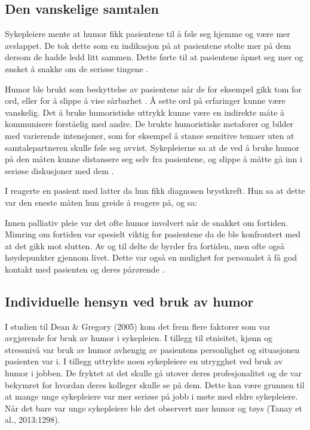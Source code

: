 \subsection{Den vanskelige samtalen}

Sykepleiere mente at humor fikk pasientene til å føle seg hjemme og være mer
avslappet. De tok dette som en indikasjon på at pasientene stolte mer på dem
dersom de hadde ledd litt sammen. Dette førte til at pasientene åpnet seg mer
og ønsket å snakke om de seriøse tingene \cite{tanay2014}.

Humor ble brukt som beskyttelse av pasientene når de for eksempel gikk tom for
ord, eller for å slippe å vise sårbarhet . Å sette ord på
erfaringer kunne være vanskelig. Det å bruke humoristiske uttrykk kunne være en
indirekte måte å kommunisere forståelig med andre. De brukte humoristiske
metaforer og bilder med varierende intensjoner, som for eksempel å stanse
sensitive temaer uten at samtalepartneren skulle føle seg avvist.  Sykepleierne
sa at de ved å bruke humor på den måten kunne distansere seg selv fra
pasientene, og slippe å måtte gå inn i seriøse diskusjoner med dem
\cite{dean2008}.

I  reagerte en pasient med latter da hun fikk diagnosen
brystkreft. Hun sa at dette var den eneste måten hun greide å reagere på, og
sa: 

Innen palliativ pleie var det ofte humor involvert når de snakket om fortiden.
Mimring om fortiden var spesielt viktig for pasientene da de ble konfrontert
med at det gikk mot slutten. Av og til delte de byrder fra fortiden, men ofte
også høydepunkter gjennom livet. Dette var også en mulighet for personalet å få
god kontakt med pasienten og deres pårørende \cite{dean2005}.

\subsection{Individuelle hensyn ved bruk av humor}

I studien til Dean \&{} Gregory (2005) kom det frem flere faktorer som var
avgjørende for bruk av humor i sykepleien. I tillegg til etnisitet, kjønn og
stressnivå  var bruk av humor avhengig av pasientens personlighet og
situasjonen pasienten var i. I tillegg uttrykte noen sykepleiere en utrygghet
ved bruk av humor i jobben. De fryktet at det skulle gå utover deres
profesjonalitet og de var bekymret for hvordan deres kolleger skulle se på dem.
Dette kan være grunnen til at mange unge sykepleiere var mer seriøse på jobb i
møte med eldre sykepleiere. Når det bare var unge sykepleiere ble det observert
mer humor og tøys (Tanay et al., 2013:1298).

